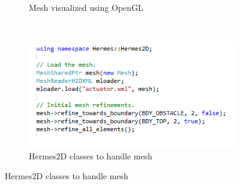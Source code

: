\documentclass{beamer}
\begin{document}
\begin{frame}
\begin{figure}[H]
\begin{subfigure}{0.55\textwidth}
			\caption{Mesh visualized using OpenGL}
		\end{subfigure}
		\ \\
		\vspace{-25mm}
		\hspace{-60mm}
		\begin{subfigure}{0.4\textwidth}
			\includegraphics[width=.95\textwidth]{codeimg/meshCode.png}
			\caption{Hermes2D classes to handle mesh}
		\end{subfigure}
	\end{figure}
	\end{frame}
\end{document}
